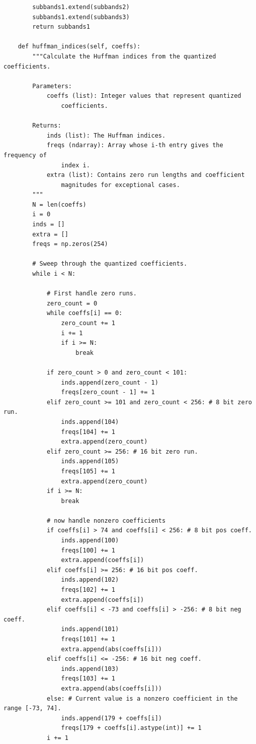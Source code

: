 \begin{lstlisting}
        subbands1.extend(subbands2)
        subbands1.extend(subbands3)
        return subbands1

    def huffman_indices(self, coeffs):
        """Calculate the Huffman indices from the quantized coefficients.

        Parameters:
            coeffs (list): Integer values that represent quantized
                coefficients.

        Returns:
            inds (list): The Huffman indices.
            freqs (ndarray): Array whose i-th entry gives the frequency of
                index i.
            extra (list): Contains zero run lengths and coefficient
                magnitudes for exceptional cases.
        """
        N = len(coeffs)
        i = 0
        inds = []
        extra = []
        freqs = np.zeros(254)

        # Sweep through the quantized coefficients.
        while i < N:

            # First handle zero runs.
            zero_count = 0
            while coeffs[i] == 0:
                zero_count += 1
                i += 1
                if i >= N:
                    break

            if zero_count > 0 and zero_count < 101:
                inds.append(zero_count - 1)
                freqs[zero_count - 1] += 1
            elif zero_count >= 101 and zero_count < 256: # 8 bit zero run.
                inds.append(104)
                freqs[104] += 1
                extra.append(zero_count)
            elif zero_count >= 256: # 16 bit zero run.
                inds.append(105)
                freqs[105] += 1
                extra.append(zero_count)
            if i >= N:
                break

            # now handle nonzero coefficients
            if coeffs[i] > 74 and coeffs[i] < 256: # 8 bit pos coeff.
                inds.append(100)
                freqs[100] += 1
                extra.append(coeffs[i])
            elif coeffs[i] >= 256: # 16 bit pos coeff.
                inds.append(102)
                freqs[102] += 1
                extra.append(coeffs[i])
            elif coeffs[i] < -73 and coeffs[i] > -256: # 8 bit neg coeff.
                inds.append(101)
                freqs[101] += 1
                extra.append(abs(coeffs[i]))
            elif coeffs[i] <= -256: # 16 bit neg coeff.
                inds.append(103)
                freqs[103] += 1
                extra.append(abs(coeffs[i]))
            else: # Current value is a nonzero coefficient in the range [-73, 74].
                inds.append(179 + coeffs[i])
                freqs[179 + coeffs[i].astype(int)] += 1
            i += 1


\end{lstlisting}
